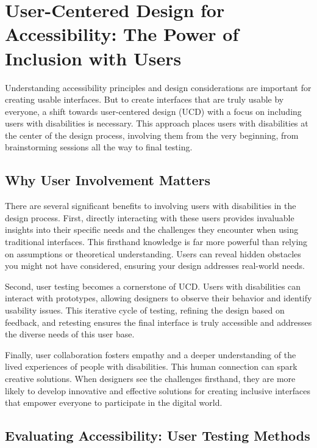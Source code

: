 \section{User-Centered Design for Accessibility: The Power of Inclusion with Users}

Understanding accessibility principles and design considerations are important
for creating usable interfaces. But to create interfaces that are truly usable
by everyone, a shift towards user-centered design (UCD) with a focus on
including users with disabilities is necessary. This approach places users with
disabilities at the center of the design process, involving them from the very
beginning, from brainstorming sessions all the way to final testing.

\subsection{Why User Involvement Matters}

There are several significant benefits to involving users with disabilities in
the design process. First, directly interacting with these users provides
invaluable insights into their specific needs and the challenges they encounter
when using traditional interfaces. This firsthand knowledge is far more powerful
than relying on assumptions or theoretical understanding. Users can reveal
hidden obstacles you might not have considered, ensuring your design addresses
real-world needs.

Second, user testing becomes a cornerstone of UCD. Users with disabilities can
interact with prototypes, allowing designers to observe their behavior and
identify usability issues. This iterative cycle of testing, refining the design
based on feedback, and retesting ensures the final interface is truly accessible
and addresses the diverse needs of this user base.

Finally, user collaboration fosters empathy and a deeper understanding of the
lived experiences of people with disabilities. This human connection can spark
creative solutions. When designers see the challenges firsthand, they are more
likely to develop innovative and effective solutions for creating inclusive
interfaces that empower everyone to participate in the digital world.

\subsection{Evaluating Accessibility: User Testing Methods}


